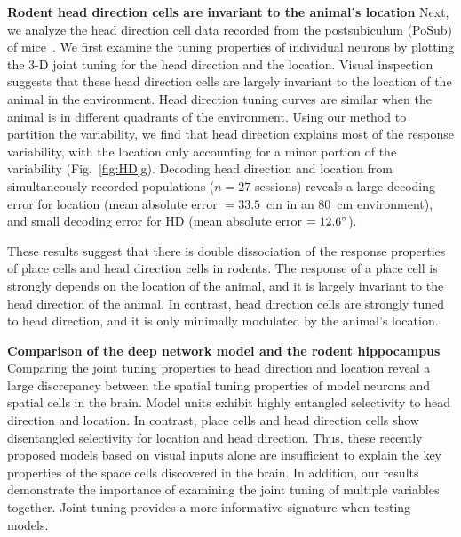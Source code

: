 \documentclass[11pt]{article}
\begin{document}
\textbf{Rodent head direction cells are invariant to the animal's location} Next, we analyze the head direction cell data recorded from the postsubiculum (PoSub) of mice~\cite{Duszkiewicz2024}. %
We first examine the tuning properties of individual neurons by plotting the 3-D joint tuning for the head direction and the location. Visual inspection suggests that these head direction cells are largely invariant to the location of the animal in the environment. Head direction tuning curves are similar when the animal is in different quadrants of the environment. 
Using our method to partition the variability, we find that head direction explains most of the response variability, with the location only accounting for a minor portion of the variability (Fig.~\ref{fig:HD}g). Decoding head direction and location from simultaneously recorded populations ($n=27$ sessions) reveals a large decoding error for location (mean absolute error $= 33.5$~cm in an 80~cm environment), and small decoding error for HD (mean absolute error $= 12.6\degree$).

These results suggest that there is double dissociation of the response properties of place cells and head direction cells in rodents. The response of a place cell is strongly depends on the location of the animal, and it is largely invariant to the head direction of the animal. In contrast, head direction cells are strongly tuned to head direction, and it is only minimally modulated by the animal's location. 



{\bf Comparison of the deep network model and the rodent hippocampus} Comparing the joint tuning properties to head direction and location reveal a large discrepancy between the spatial tuning properties of model neurons and spatial cells in the brain. Model units exhibit highly entangled selectivity to head direction and location. In contrast, place cells and head direction cells show disentangled selectivity for location and head direction. Thus, these recently proposed models based on visual inputs alone are insufficient to explain the key properties 
of the space cells discovered in the brain. 
In addition, our results demonstrate the importance of examining the joint tuning of multiple variables together. Joint tuning provides a more informative signature when testing models.
\end{document}
